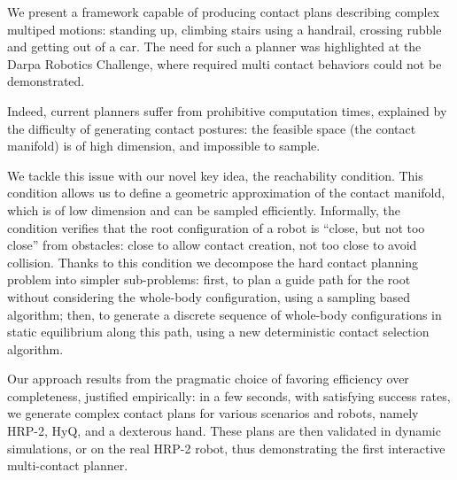 We present a framework capable of producing contact plans describing complex multiped motions: standing up, climbing stairs using a handrail, crossing rubble and getting out of a car. The need for such a planner was highlighted at the Darpa Robotics Challenge, where required multi contact behaviors
could not be demonstrated.

Indeed, current planners suffer from prohibitive computation times, explained by the difficulty
of generating contact postures: the feasible space (the contact manifold) is of high dimension,
and impossible to sample.

We tackle this issue with our novel key idea, the reachability condition. This condition allows us to define
a geometric approximation of the contact manifold, which is of low dimension and can be sampled efficiently.
Informally, the condition verifies that the root configuration of a robot is “close, but not too close” from obstacles: close to allow contact creation, not too close to avoid collision. Thanks to this condition we decompose the hard contact planning problem into
simpler sub-problems: first, to plan a guide path for the root without considering the whole-body configuration, using a sampling
based algorithm; then, to generate a discrete sequence of whole-body configurations in static equilibrium along this path, using a new deterministic
contact selection algorithm. 

Our approach results from the pragmatic choice of favoring efficiency over completeness, justified empirically: in a
few seconds, with satisfying success rates, we generate complex contact plans for various scenarios and robots, namely
HRP-2, HyQ, and a dexterous hand. These plans are then validated in dynamic simulations, or on the real HRP-2 robot, thus demonstrating 
the first interactive multi-contact planner.
